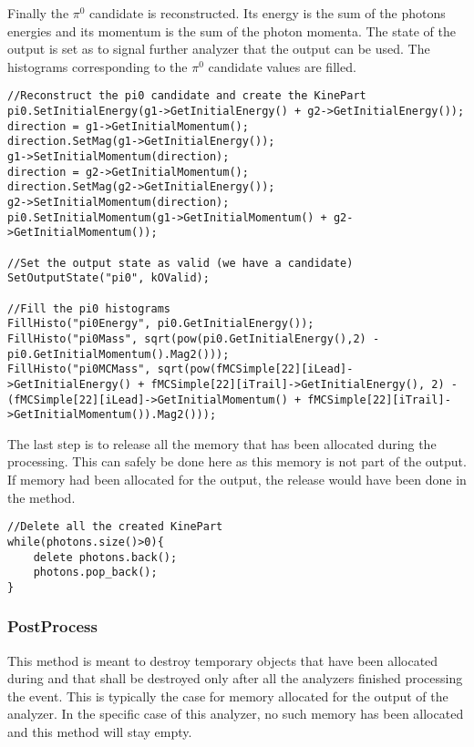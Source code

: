Finally the $\pi^0$ candidate is reconstructed. Its energy is the sum of the photons energies and
its momentum  is the sum of the photon momenta. The state of the output is set as 
to signal further analyzer that the output can be used. The histograms corresponding to the $\pi^0$
candidate values are filled.
\begin{lstlisting}
//Reconstruct the pi0 candidate and create the KinePart
pi0.SetInitialEnergy(g1->GetInitialEnergy() + g2->GetInitialEnergy());
direction = g1->GetInitialMomentum();
direction.SetMag(g1->GetInitialEnergy());
g1->SetInitialMomentum(direction);
direction = g2->GetInitialMomentum();
direction.SetMag(g2->GetInitialEnergy());
g2->SetInitialMomentum(direction);
pi0.SetInitialMomentum(g1->GetInitialMomentum() + g2->GetInitialMomentum());

//Set the output state as valid (we have a candidate)
SetOutputState("pi0", kOValid);

//Fill the pi0 histograms
FillHisto("pi0Energy", pi0.GetInitialEnergy());
FillHisto("pi0Mass", sqrt(pow(pi0.GetInitialEnergy(),2) - pi0.GetInitialMomentum().Mag2()));
FillHisto("pi0MCMass", sqrt(pow(fMCSimple[22][iLead]->GetInitialEnergy() + fMCSimple[22][iTrail]->GetInitialEnergy(), 2) - (fMCSimple[22][iLead]->GetInitialMomentum() + fMCSimple[22][iTrail]->GetInitialMomentum()).Mag2()));
\end{lstlisting}


The last step is to release all the memory that has been allocated during the processing. This can
safely be done here as this memory is not part of the output. If memory had been allocated for the
output, the release would have been done in the  method.
\begin{lstlisting}
//Delete all the created KinePart
while(photons.size()>0){
	delete photons.back();
	photons.pop_back();
}
\end{lstlisting}

\subsubsection{PostProcess}
This method is meant to destroy temporary objects that have been allocated during 
and that shall be destroyed only after all the analyzers finished processing the event. This is
typically the case for memory allocated for the output of the analyzer. In the specific case of this
analyzer, no such memory has been allocated and this method will stay empty.


